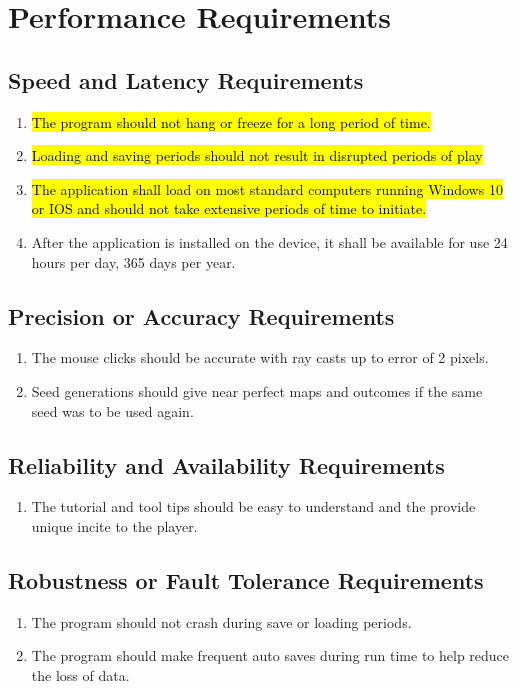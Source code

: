 \documentclass{article}
\begin{document}
\section{Performance Requirements}
\subsection{Speed and Latency Requirements}
\begin{enumerate}[{SLR}1. ]
	\item \hl{The program should not hang or freeze for a long period of time.}
	\item \hl{Loading and saving periods should not result in disrupted periods of play}
	\item \hl{The application shall load on most standard computers running Windows 10 or IOS and should not take extensive periods of time to initiate.}
	\item After the application is installed on the device, it shall be available for use 24 hours per day, 365 days per year.
\end{enumerate}
\subsection{Precision or Accuracy Requirements}
\begin{enumerate}[{PAR}1. ]
	\item The mouse clicks should be accurate with ray casts up to error of 2 pixels.
	\item Seed generations should give near perfect maps and outcomes if the same seed was to be used again.
\end{enumerate}
\subsection{Reliability and Availability Requirements}
\begin{enumerate}[{RAR}1. ]
	\item The tutorial and tool tips should be easy to understand and the provide unique incite to the player.
\end{enumerate}
\subsection{Robustness or Fault Tolerance Requirements}
\begin{enumerate}[{RFR}1. ]
	\item The program should not crash during save or loading periods.
	\item The program should make frequent auto saves during run time to help reduce the loss of data.
\end{enumerate}
\end{document}
